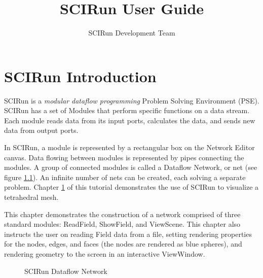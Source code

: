 \documentclass[fleqn,12pt,openany]{book}
\title{SCIRun User Guide}
\author{SCIRun Development Team}
\begin{document}


\maketitle


\chapter{SCIRun Introduction}\label{intro}

\begin{introduction}
SCIRun is a \emph{modular dataflow programming} Problem Solving Environment (PSE).
SCIRun has a set of Modules that perform specific functions on a data stream.
Each module reads data from its input ports, calculates the data, and sends new data from output ports.
\end{introduction}

In SCIRun, a module is represented by a rectangular box on the Network Editor canvas.
Data flowing between modules is represented by pipes connecting the modules.
A group of connected modules is called a Dataflow Network, or net (see figure \ref{sample_network}).
An infinite number of nets can be created, each solving a separate problem.
Chapter \ref{intro} of this tutorial demonstrates the use of SCIRun to visualize
a tetrahedral mesh.

This chapter demonstrates the construction of a network comprised of three
standard modules: ReadField, ShowField, and ViewScene.
This chapter also instructs the user on reading Field data from a file, setting
rendering properties for the nodes, edges, and faces (the nodes are rendered as
blue spheres), and rendering geometry to the screen in an interactive ViewWindow.

\begin{figure}[H]\label{sample_network}
\begin{centering}
\caption{SCIRun Dataflow Network}
\end{centering}
\end{figure}
\end{document}
